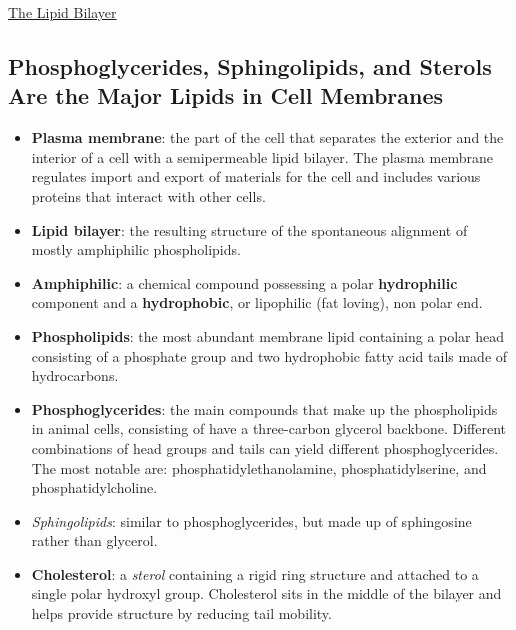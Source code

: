 \documentclass[12pt,letterpaper]{article}
\begin{document}
\hypertarget{10.1a}{}
\begin{secbox}{\hyperlink{10}{The Lipid Bilayer}}{
    \hypertarget{10.1}{\subsection*{Phosphoglycerides, Sphingolipids, and Sterols Are the Major Lipids in Cell Membranes}}
    \begin{itemize}
        \item \textbf{Plasma membrane}: the part of the cell that separates the exterior and the interior of a cell with a semipermeable lipid bilayer. The plasma membrane regulates import and export of materials for the cell and includes various proteins that interact with other cells. 
        \item \textbf{Lipid bilayer}: the resulting structure of the spontaneous alignment of mostly amphiphilic phospholipids. 
        \item \textbf{Amphiphilic}: a chemical compound possessing a polar \textbf{hydrophilic} component and a \textbf{hydrophobic}, or lipophilic (fat loving), non polar end.
        \item \textbf{Phospholipids}: the most abundant membrane lipid containing a polar head consisting of a phosphate group and two hydrophobic fatty acid tails made of hydrocarbons.
        \item \textbf{Phosphoglycerides}: the main compounds that make up the phospholipids in animal cells, consisting of have a three-carbon glycerol backbone. Different combinations of head groups and tails can yield different phosphoglycerides. The most notable are: phosphatidylethanolamine, phosphatidylserine, and phosphatidylcholine.
        \item \textit{Sphingolipids}: similar to phosphoglycerides, but made up of sphingosine rather than glycerol.
        \item \textbf{Cholesterol}: a \textit{sterol} containing a rigid ring structure and attached to a single polar hydroxyl group. Cholesterol sits in the middle of the bilayer and helps provide structure by reducing tail mobility. 
    \end{itemize}

}
\end{secbox}
\end{document}
